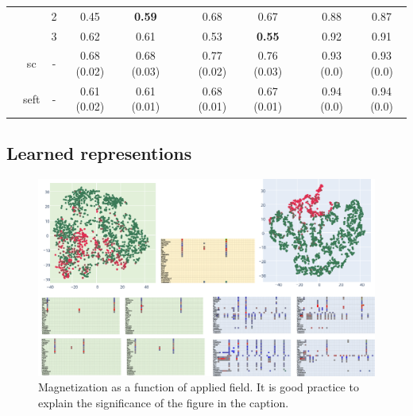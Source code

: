 \documentclass[journal,twoside,web]{ieeecolor}
\begin{document}
\begin{table}[htbp]
\begin{tabular}{ccccccccccc}
            &       & 2     & 0.45  & \textbf{0.59} &       & 0.68  & 0.67  &       & 0.88  & 0.87 \\
            &       & 3     & 0.62  & 0.61  &       & 0.53  & \textbf{0.55} &       & 0.92  & 0.91 \\
  \cmidrule{2-11}          & sc    & -     & 0.68 (0.02) & 0.68 (0.03) &       & 0.77 (0.02) & 0.76 (0.03) &       & 0.93 (0.0) & 0.93 (0.0) \\
            & seft  & -     & 0.61 (0.02) & 0.61 (0.01) &       & 0.68 (0.01) & 0.67 (0.01) &       & 0.94 (0.0) & 0.94 (0.0) \\
      \bottomrule
      \bottomrule
      \end{tabular}%
    \label{tab:3}%
  \end{table}%
  
  
  








\subsection{Learned representions}



\begin{figure}[!t]
    \centerline{\includegraphics{images/tsne.png}}
    \caption{Magnetization as a function of applied field.
    It is good practice to explain the significance of the figure in the caption.}
    \label{fig1}
    \end{figure}
\end{document}
